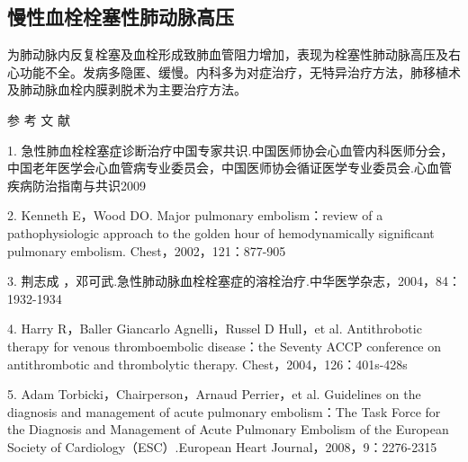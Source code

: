 \subsection{慢性血栓栓塞性肺动脉高压}

为肺动脉内反复栓塞及血栓形成致肺血管阻力增加，表现为栓塞性肺动脉高压及右心功能不全。发病多隐匿、缓慢。内科多为对症治疗，无特异治疗方法，肺移植术及肺动脉血栓内膜剥脱术为主要治疗方法。

\protect\hypertarget{text00279.html}{}{}

\hypertarget{text00279.htmlux5cux23CHP9-8-5}{}
参 考 文 献

1.
急性肺血栓栓塞症诊断治疗中国专家共识.中国医师协会心血管内科医师分会，中国老年医学会心血管病专业委员会，中国医师协会循证医学专业委员会.心血管疾病防治指南与共识2009

2. Kenneth E，Wood DO. Major pulmonary embolism：review of a
pathophysiologic approach to the golden hour of hemodynamically
significant pulmonary embolism. Chest，2002，121：877-905

3. 荆志成
，邓可武.急性肺动脉血栓栓塞症的溶栓治疗.中华医学杂志，2004，84：1932-1934

4. Harry R，Baller Giancarlo Agnelli，Russel D Hull，et al.
Antithrobotic therapy for venous thromboembolic disease：the Seventy
ACCP conference on antithrombotic and thrombolytic therapy.
Chest，2004，126：401s-428s

5. Adam Torbicki，Chairperson，Arnaud Perrier，et al. Guidelines on the
diagnosis and management of acute pulmonary embolism：The Task Force for
the Diagnosis and Management of Acute Pulmonary Embolism of the European
Society of Cardiology（ESC）.European Heart Journal，2008，9：2276-2315

\protect\hypertarget{text00280.html}{}{}

